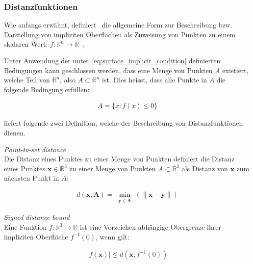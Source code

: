 \subsubsection{Distanzfunktionen}
\label{ssubsec:distance_functions}

Wie anfangs erwähnt, definiert~\citeauthor{hart_sphere_1994} die
allgemeine Form zur Beschreibung bzw. Darstellung von impliziten
Oberflächen als Zuweisung von Punkten zu einem skalaren Wert: $ f :
\mathbb{R}^{n} \to \mathbb{R} $~\parencite[S. 527]{hart_sphere_1994}.

Unter Anwendung der unter~\autoref{eq:surface_implicit_condition}
definierten Bedingungen kann geschlossen werden, dass eine Menge von
Punkten $A$ existiert, welche Teil von $\mathbb{R}^{n}$, also $A \subset
\mathbb{R}^{n}$ ist. Dies heisst, dass alle Punkte in $A$ die folgende
Bedingung erfüllen:

\begin{gather}
    A = \{ x : f(x) \leq 0 \}
\end{gather}

\citeauthor{hart_sphere_1994} liefert folgende zwei Definition, welche der
Beschreibung von Distanzfunktionen dienen.

\theoremstyle{definition}
\begin{definition}{\label{theo:point_to_set_distance}
    \textit{Point-to-set distance}}\\
    Die Distanz eines Punktes zu einer Menge von Punkten definiert die Distanz
    eines Punktes $ \bm{x} \in \mathbb{R}^{3} $ zu einer Menge von Punkten $A
    \subset \mathbb{R}^{3}$ als Distanz von $\bm{x}$ zum nächsten Punkt in $A$:

    \begin{gather}
        d(\bm{x}, \bm{A}) = \min_{\substack{\bm{y} \in \bm{A}}}(\|\bm{x} - \bm{y}\|)
    \end{gather}
\end{definition}

\theoremstyle{definition}
\begin{definition}{\label{theo:signed_distnace_bound}
    \textit{Signed distance bound}}\\ 
    Eine Funktion $ f : \mathbb{R}^{3} \to \mathbb{R} $ ist eine
    Vorzeichen abhängige Obergrenze ihrer impliziten Oberfläche $ f^{-1}(0)$,
    wenn gilt:

    \begin{gather}\label{eq:signed_distnace_bound}
        |f(\bm{x})| \leq d(\bm{x}, f^{-1}(0))
    \end{gather}
\end{definition}

